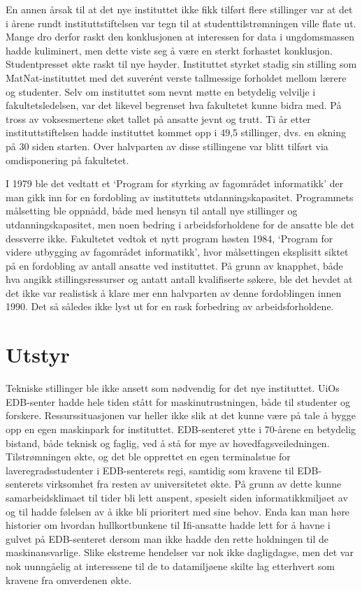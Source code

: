 En annen årsak til at det nye instituttet ikke fikk tilført flere stillinger var at det i årene rundt instituttstiftelsen var tegn til at studenttilstrømningen ville flate ut. Mange dro derfor raskt den konklusjonen at interessen for data i ungdomsmassen hadde kuliminert, men dette viste seg å være en sterkt forhastet konklusjon. Studentpresset økte raskt til nye høyder. Instituttet styrket stadig sin stilling som MatNat-instituttet med det suverént verste tallmessige forholdet mellom lærere og studenter. Selv om instituttet som nevnt møtte en betydelig velvilje i fakultetsledelsen, var det likevel begrenset hva fakultetet kunne bidra med. På tross av voksesmertene øket tallet på ansatte jevnt og trutt. Ti år etter instituttstiftelsen hadde instituttet kommet opp i 49,5 stillinger, dvs. en økning på 30 siden starten. Over halvparten av disse stillingene var blitt tilført via omdisponering på fakultetet. 

I 1979 ble det vedtatt et `Program for styrking av fagområdet informatikk' der man gikk inn for en fordobling av instituttets utdanningskapasitet. Programmets målsetting ble oppnådd, både med hensyn til antall nye stillinger og utdanningskapasitet, men noen bedring i arbeidsforholdene for de ansatte ble det dessverre ikke. Fakultetet vedtok et nytt program høsten 1984, `Program for videre utbygging av fagområdet informatikk', hvor målsettingen eksplisitt siktet på en fordobling av antall ansatte ved instituttet. På grunn av knapphet, både hva angikk stillingsressurser og antatt antall kvalifiserte søkere, ble det hevdet at det ikke var realistisk å klare mer enn halvparten av denne fordoblingen innen 1990. Det så således ikke lyst ut for en rask forbedring av arbeidsforholdene.

\section{Utstyr}

Tekniske stillinger ble ikke ansett som nødvendig for det nye instituttet. UiOs EDB-senter hadde hele tiden stått for maskinutrustningen, både til studenter og forskere. Ressurssituasjonen var heller ikke slik at det kunne være på tale å bygge opp en egen maskinpark for instituttet. EDB-senteret ytte i 70-årene en betydelig bistand, både teknisk og faglig, ved å stå for mye av hovedfagsveiledningen. Tilstrømningen økte, og det ble opprettet en egen terminalstue for laveregradsstudenter i EDB-senterets regi, samtidig som kravene til EDB-senterets virksomhet fra resten av universitetet økte. På grunn av dette kunne samarbeidsklimaet til tider bli lett anspent, spesielt siden informatikkmiljøet av og til hadde følelsen av å ikke bli prioritert med sine behov. Enda kan man høre historier om hvordan hullkortbunkene til Ifi-ansatte hadde lett for å havne i gulvet på EDB-senteret dersom man ikke hadde den rette holdningen til de maskinansvarlige. Slike ekstreme hendelser var nok ikke dagligdagse, men det var nok uunngåelig at interessene til de to datamiljøene skilte lag etterhvert som kravene fra omverdenen økte.

